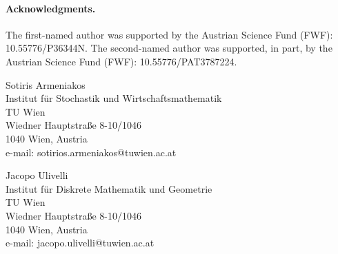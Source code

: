 \documentclass[a4paper, 11pt]{article}
\theoremstyle{definition}
\begin{document}
\bigskip

\paragraph{Acknowledgments.} The first-named author was supported by the Austrian Science Fund (FWF): 10.55776/P36344N. The second-named author was supported, in part, by the Austrian Science Fund (FWF): 10.55776/PAT3787224.

\footnotesize



\parbox[t]{8.5cm}{
Sotiris Armeniakos\\
Institut f\"ur Stochastik und Wirtschaftsmathematik\\
TU Wien\\
Wiedner Hauptstra{\ss}e 8-10/1046\\
1040 Wien, Austria\\
e-mail: sotirios.armeniakos@tuwien.ac.at}

\medskip

\parbox[t]{8.5cm}{
Jacopo Ulivelli\\
Institut f\"ur Diskrete Mathematik und Geometrie\\
TU Wien\\
Wiedner Hauptstra{\ss}e 8-10/1046\\
1040 Wien, Austria\\
e-mail: jacopo.ulivelli@tuwien.ac.at}
\end{document}
